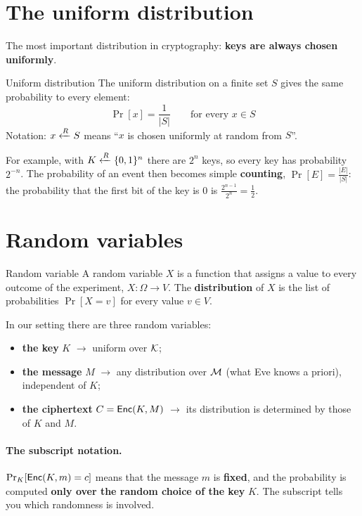 \section{The uniform distribution}

The most important distribution in cryptography: \textbf{keys are always chosen uniformly}.

\begin{frameddefn}{Uniform distribution}
  The uniform distribution on a finite set $S$ gives the same probability to every element:
  \[
    \Pr[x] = \frac{1}{|S|} \qquad \text{for every } x \in S
  \]
  Notation: $x \xleftarrow{R} S$ means ``$x$ is chosen uniformly at random from $S$''.
\end{frameddefn}

For example, with $K \xleftarrow{R} \{0,1\}^n$ there are $2^n$ keys, so every key has probability $2^{-n}$. The probability of an event then becomes simple \textbf{counting}, $\Pr[E] = \frac{|E|}{|S|}$: the probability that the first bit of the key is $0$ is $\frac{2^{n-1}}{2^n} = \frac{1}{2}$.

\section{Random variables}

\begin{frameddefn}{Random variable}
  A random variable $X$ is a function that assigns a value to every outcome of the experiment, $X : \Omega \to V$. The \textbf{distribution} of $X$ is the list of probabilities $\Pr[X = v]$ for every value $v \in V$.
\end{frameddefn}

In our setting there are three random variables:
\begin{itemize}
  \item \textbf{the key} $K$ $\to$ uniform over $\mathcal{K}$;
  \item \textbf{the message} $M$ $\to$ any distribution over $\mathcal{M}$ (what Eve knows a priori), independent of $K$;
  \item \textbf{the ciphertext} $C = \mathsf{Enc}(K, M)$ $\to$ its distribution is determined by those of $K$ and $M$.
\end{itemize}

\paragraph{The subscript notation.} $\Pr_K[\mathsf{Enc}(K, m) = c]$ means that the message $m$ is \textbf{fixed}, and the probability is computed \textbf{only over the random choice of the key} $K$. The subscript tells you which randomness is involved.

